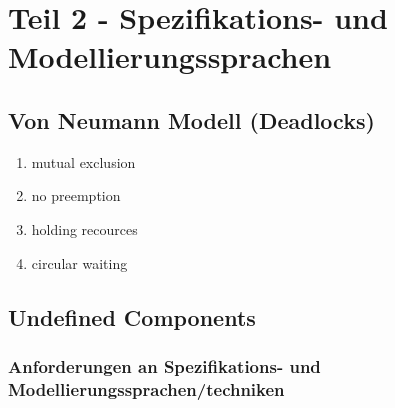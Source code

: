 \section{Teil 2 - Spezifikations- und Modellierungssprachen}

\subsection{Von Neumann Modell (Deadlocks)}

\begin{enumerate}
    \item mutual exclusion
    \item no preemption
    \item holding recources
    \item circular waiting
\end{enumerate}



\subsection{Undefined Components}

\subsubsection{Anforderungen an Spezifikations- und Modellierungssprachen/techniken}


